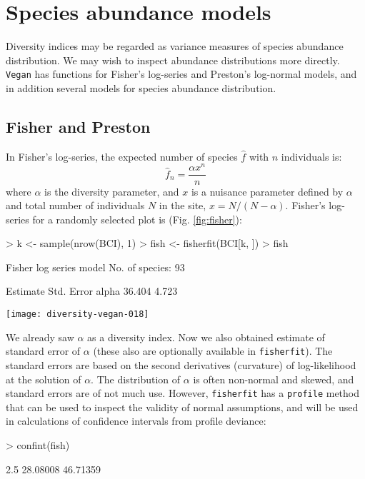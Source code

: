 \documentclass[a4paper,10pt]{amsart}
\begin{document}
\section{Species abundance models}

Diversity indices may be regarded as variance measures of species
abundance distribution.  We may wish to inspect abundance
distributions more directly.  \texttt{Vegan} has functions for
Fisher's log-series and Preston's log-normal models, and in addition
several models for species abundance distribution.

\subsection{Fisher and Preston}

In Fisher's log-series, the expected number of species $\hat f$ with $n$
individuals is:
\begin{equation}
\hat f_n = \frac{\alpha x^n}{n}
\end{equation}
where $\alpha$ is the diversity parameter, and $x$ is a nuisance
parameter defined by $\alpha$ and total number
of individuals $N$ in the site, $x = N/(N-\alpha)$.  Fisher's
log-series for a randomly selected plot is (Fig. \ref{fig:fisher}):
\begin{Schunk}
\begin{Sinput}
> k <- sample(nrow(BCI), 1)
> fish <- fisherfit(BCI[k, ])
> fish
\end{Sinput}
\begin{Soutput}
Fisher log series model
No. of species: 93 

      Estimate Std. Error
alpha   36.404      4.723
\end{Soutput}
\end{Schunk}
\begin{SCfigure}
\texttt{[image: diversity-vegan-018]}
\caption{Fisher's log-series fitted to one randomly selected site
  (50).}
\label{fig:fisher}
\end{SCfigure}
We already saw $\alpha$ as a diversity index.  Now we also obtained
estimate of standard error of $\alpha$ (these also are optionally
available in \texttt{fisherfit}).  The standard errors are based on
the second derivatives (curvature) of log-likelihood at the solution
of $\alpha$.  The distribution of $\alpha$ is often non-normal
and skewed, and standard errors are of not much use.  However,
\texttt{fisherfit} has a \texttt{profile} method that can be used to
inspect the validity of normal assumptions, and will be used in
calculations of confidence intervals from profile deviance:
\begin{Schunk}
\begin{Sinput}
> confint(fish)
\end{Sinput}
\begin{Soutput}
   2.5 %   97.5 % 
28.08008 46.71359 
\end{Soutput}
\end{Schunk}
\end{document}
